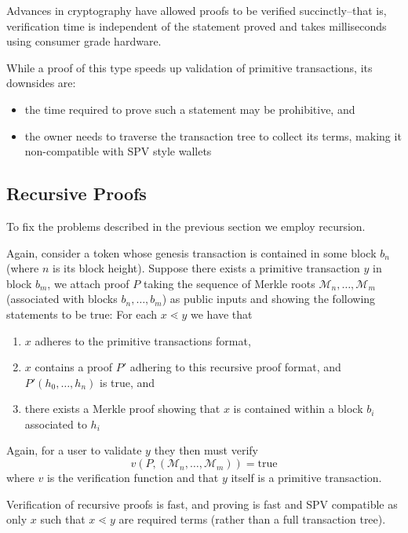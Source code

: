 \documentclass[9pt,oneside]{amsart}
\begin{document}
\begin{multicols}{2}
Advances in cryptography have allowed proofs to be verified succinctly--that is, verification time is independent of the statement proved and takes milliseconds using consumer grade hardware.


While a proof of this type speeds up validation of primitive transactions, its downsides are:
\begin{itemize}
    \item the time required to prove such a statement may be prohibitive, and
    \item the owner needs to traverse the transaction tree to collect its terms, making it non-compatible with SPV style wallets
\end{itemize}

\subsection{Recursive Proofs}
To fix the problems described in the previous section we employ recursion.

Again, consider a token whose genesis transaction is contained in some block $b_{n}$ (where $n$ is its block height). Suppose there exists a primitive transaction $y$ in block $b_{m}$, we attach proof $P$ taking the sequence of Merkle roots $\mathcal{M}_{n}, \dots, \mathcal{M}_{m}$ (associated with blocks $b_{n}, \dots, b_{m}$) as public inputs and showing the following statements to be true:
For each $x \lessdot y$ we have that
\begin{enumerate}
    \item $x$ adheres to the primitive transactions format,
    \item $x$ contains a proof $P'$ adhering to this recursive proof format, and $P'(h_{0}, \dots, h_{n})$ is true, and
    \item there exists a Merkle proof showing that $x$ is contained within a block $b_{i}$ associated to $h_{i}$
\end{enumerate}

Again, for a user to validate $y$ they then must verify
\[v(P, (\mathcal{M}_{n}, \dots, \mathcal{M}_{m})) = \text{true}\]
where $v$ is the verification function and that $y$ itself is a primitive transaction.

Verification of recursive proofs is fast, and proving is fast and SPV compatible as only $x$ such that $x \lessdot y$ are required terms (rather than a full transaction tree).


\end{multicols}
\end{document}
